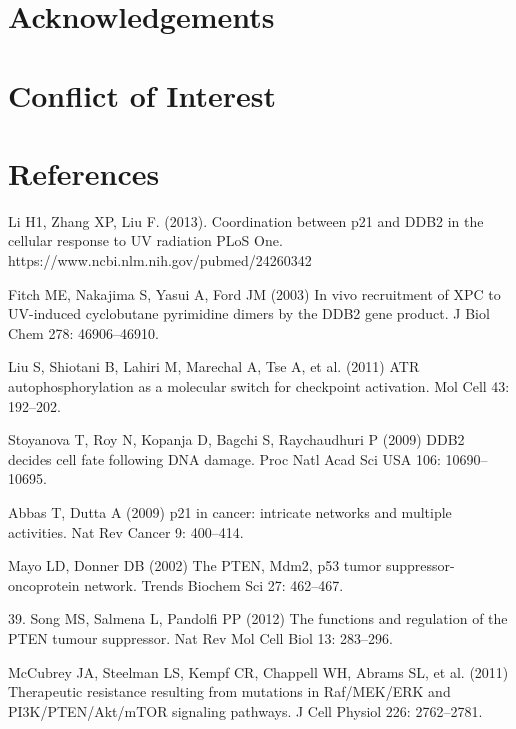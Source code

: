 \documentclass[preprint, 8pt]{elsarticle}
\theoremstyle{definition}
\begin{document}
\begin{table}[H]
\begin{enumerate}
\end{enumerate}

\section{Acknowledgements}


\section{Conflict of Interest}

\section{References}


\begin{thebibliography}{00}
\footnotesize
{}Li H1, Zhang XP, Liu F. (2013). 
\newblock Coordination between p21 and DDB2 in the cellular response to UV radiation 
\newblock PLoS One. https://www.ncbi.nlm.nih.gov/pubmed/24260342

Fitch ME, Nakajima S, Yasui A, Ford JM (2003) 
\newblock In vivo recruitment of XPC to UV-induced cyclobutane pyrimidine dimers by the DDB2 gene product. 
\newblock J Biol Chem 278: 46906–46910.

 Liu S, Shiotani B, Lahiri M, Marechal A, Tse A, et al. (2011) 
\newblock ATR autophosphorylation as a molecular switch for checkpoint activation. 
\newblock Mol Cell 43: 192–202.

 Stoyanova T, Roy N, Kopanja D, Bagchi S, Raychaudhuri P (2009) 
\newblock DDB2 decides cell fate following DNA damage. 
\newblock Proc Natl Acad Sci USA 106: 10690–10695.

 Abbas T, Dutta A (2009) 
\newblock p21 in cancer: intricate networks and multiple activities. 
\newblock Nat Rev Cancer 9: 400–414.

 Mayo LD, Donner DB (2002) 
\newblock The PTEN, Mdm2, p53 tumor suppressor-oncoprotein network. 
\newblock Trends Biochem Sci 27: 462–467.

 39. Song MS, Salmena L, Pandolfi PP (2012) 
\newblock The functions and regulation of the PTEN tumour suppressor. 
\newblock Nat Rev Mol Cell Biol 13: 283–296.

 McCubrey JA, Steelman LS, Kempf CR, Chappell WH, Abrams SL, et al. (2011) 
\newblock Therapeutic resistance resulting from mutations in Raf/MEK/ERK and PI3K/PTEN/Akt/mTOR signaling pathways. 
\newblock J Cell Physiol 226: 2762–2781.


\end{thebibliography}
\end{table}
\end{document}
